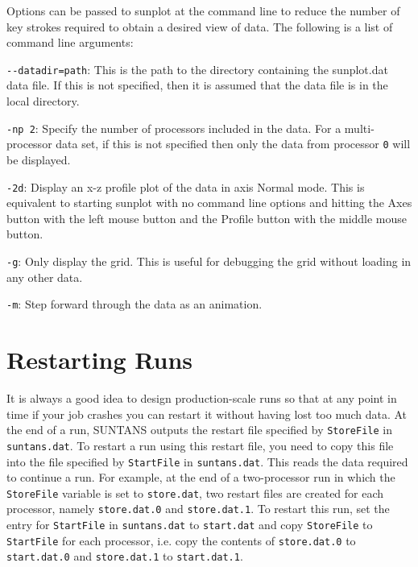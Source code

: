 \documentclass[12pt,oneside]{article}
\begin{document}
Options can be passed to sunplot at the command line to reduce the number of key strokes
required to obtain a desired view of data.  The following is a list of command line arguments:
\begin{list}{}
\item \verb+--datadir=path+: This is the path to the directory containing the sunplot.dat
data file.  If this is not specified, then it is assumed that the data file is in the local
directory.
\item \verb+-np 2+: Specify the number of processors included in the data.  For a multi-processor
data set, if this is not specified then only the data from processor \verb+0+ will be displayed.
\item \verb+-2d+: Display an x-z profile plot of the data in axis Normal mode.  This is equivalent
to starting sunplot with no command line options and hitting the Axes button with the left mouse
button and the Profile button with the middle mouse button.
\item \verb+-g+: Only display the grid.  This is useful for debugging the grid without loading
in any other data.
\item \verb+-m+: Step forward through the data as an animation.
\end{list}

\section{Restarting Runs} \label{sec:restart}

It is always a good idea to design production-scale runs so that at any point in time if your
job crashes you can restart it without having lost too much data.  At the end of a run, SUNTANS
outputs the restart file specified by \verb+StoreFile+ in \verb+suntans.dat+.  To restart a run using
this restart file, you need to copy this file into the file specified by \verb+StartFile+ in \verb+suntans.dat+.
This reads the data required to continue a run.  For example, at the end of a two-processor run in which
the \verb+StoreFile+ variable is set to \verb+store.dat+, two restart files are created for each processor, 
namely \verb+store.dat.0+ and \verb+store.dat.1+.  To restart this run, set the entry for \verb+StartFile+ in
\verb+suntans.dat+ to \verb+start.dat+ and copy \verb+StoreFile+ to \verb+StartFile+ for each processor, i.e.
copy the contents of \verb+store.dat.0+ to \verb+start.dat.0+ and \verb+store.dat.1+ to \verb+start.dat.1+.
\end{document}
